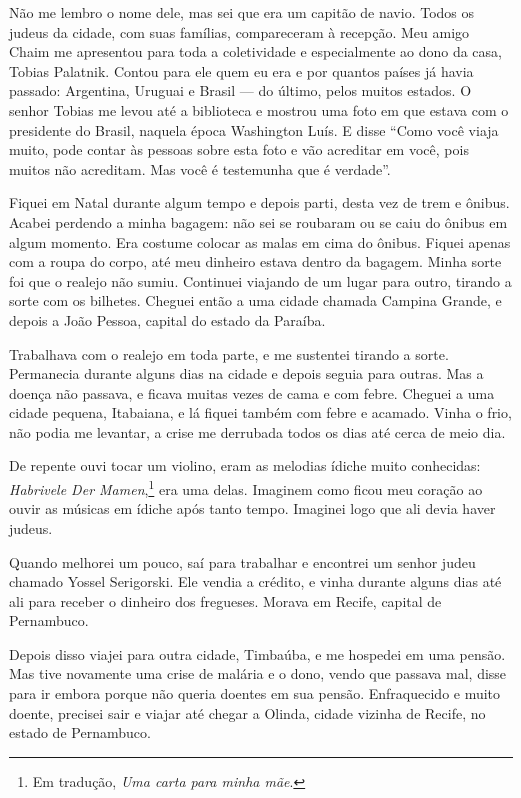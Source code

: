 Não me lembro o nome dele, mas sei que era um capitão de navio. Todos os judeus da cidade, com suas famílias, compareceram à recepção. Meu amigo Chaim me apresentou para toda a coletividade e especialmente ao dono da casa, Tobias Palatnik. Contou para ele quem eu era e por quantos países já havia passado: Argentina, Uruguai e Brasil --- do último, pelos muitos estados. O senhor Tobias me levou até a biblioteca e mostrou uma foto em que estava com o presidente do Brasil, naquela época Washington Luís. E disse ``Como você viaja muito, pode contar às pessoas sobre esta foto e vão acreditar em você, pois muitos não acreditam. Mas você é testemunha que é verdade''.

Fiquei em Natal durante algum tempo e depois parti, desta vez de
trem e ônibus. Acabei perdendo a minha bagagem: não sei se roubaram ou
se caiu do ônibus em algum momento. Era costume colocar as malas
em cima do ônibus. Fiquei apenas com a roupa do corpo, até meu 
dinheiro estava dentro da bagagem. Minha sorte foi
que o realejo não sumiu. Continuei viajando de um lugar para outro,
tirando a sorte com os bilhetes. Cheguei então a uma cidade chamada
Campina Grande, e depois a João Pessoa, capital do estado da Paraíba.

Trabalhava com o realejo em toda parte, e me sustentei tirando a sorte. Permanecia 
durante alguns dias na cidade e depois seguia para outras. Mas a doença não passava, e ficava muitas vezes de cama e com febre. Cheguei a uma cidade pequena, Itabaiana, e lá fiquei também com febre e
acamado. Vinha o frio, não podia me levantar, a crise me derrubada todos os dias até cerca de meio dia. 

De repente ouvi tocar um violino, eram
as melodias ídiche muito conhecidas: \textit{Habrivele Der Mamen},\footnote{Em tradução, \textit{Uma carta para minha mãe}.} era uma delas. Imaginem como ficou meu coração ao ouvir as músicas em ídiche após tanto tempo. Imaginei logo que ali devia haver judeus.

Quando melhorei um pouco, saí para trabalhar e encontrei um senhor judeu
chamado Yossel Serigorski. Ele vendia a crédito, e vinha durante alguns
dias até ali para receber o dinheiro dos fregueses. Morava em Recife, capital de Pernambuco.

Depois disso viajei para outra cidade, Timbaúba, e me hospedei em
uma pensão. Mas tive novamente uma crise de malária e o dono, vendo que passava mal, disse para ir embora porque não queria doentes
em sua pensão. Enfraquecido e muito doente, precisei sair e viajar até
chegar a Olinda, cidade vizinha de Recife, no estado de Pernambuco.

